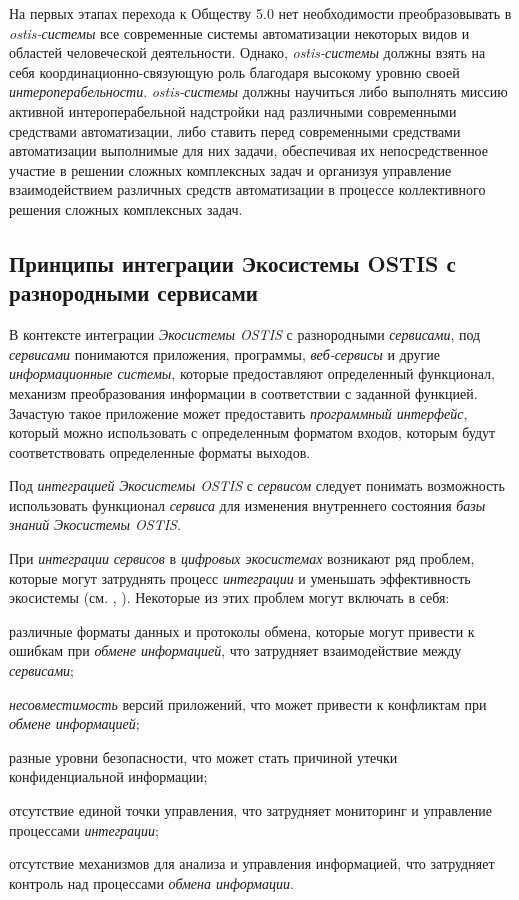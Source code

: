 На первых этапах перехода к Обществу 5.0 нет необходимости преобразовывать в \textit{ostis-системы} все современные системы автоматизации некоторых видов и областей человеческой деятельности. 
Однако, \textit{ostis-системы} должны взять на себя координационно-связующую роль благодаря высокому уровню своей \textit{интероперабельности}. 
\textit{ostis-системы} должны научиться либо выполнять миссию активной интероперабельной надстройки над различными современными средствами автоматизации, либо ставить перед современными средствами автоматизации выполнимые для них задачи, обеспечивая их непосредственное участие в решении сложных комплексных задач и организуя управление взаимодействием различных средств автоматизации в процессе коллективного решения сложных комплексных задач.

\subsection{Принципы интеграции Экосистемы OSTIS с разнородными сервисами}
{\label{sec_integration_services}} 

В контексте интеграции \textit{Экосистемы OSTIS} с разнородными \textit{сервисами}, под \textit{сервисами} понимаются приложения, программы, \textit{веб-сервисы} и другие \textit{информационные системы}, которые предоставляют определенный функционал, механизм преобразования информации в соответствии с заданной функцией. Зачастую такое приложение может предоставить \textit{программный интерфейс}, который можно использовать с определенным форматом входов, которым будут соответствовать определенные форматы выходов.

Под \textit{интеграцией} \textit{Экосистемы OSTIS} с \textit{сервисом} следует понимать возможность использовать функционал \textit{сервиса} для изменения внутреннего состояния \textit{базы знаний} \textit{Экосистемы OSTIS}. 

При \textit{интеграции} \textit{сервисов} в \textit{цифровых экосистемах} возникают ряд проблем, которые могут затруднять процесс \textit{интеграции} и уменьшать эффективность экосистемы (см. , ). Некоторые из этих проблем могут включать в себя:

\begin{textitemize}
    \item различные форматы данных и протоколы обмена, которые могут привести к ошибкам при \textit{обмене информацией}, что затрудняет взаимодействие между \textit{сервисами};
    \item \textit{несовместимость} версий приложений, что может привести к конфликтам при \textit{обмене информацией};
    \item разные уровни безопасности, что может стать причиной утечки конфиденциальной информации;
    \item отсутствие единой точки управления, что затрудняет мониторинг и управление процессами \textit{интеграции};
    \item отсутствие механизмов для анализа и управления информацией, что затрудняет контроль над процессами \textit{обмена информации}.
\end{textitemize}

